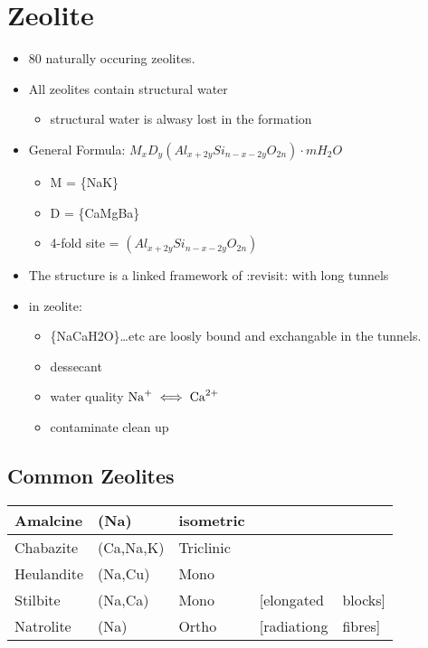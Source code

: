 \documentclass[11pt]{article}
\begin{document}
\section{Zeolite}
\label{sec-3}
\begin{itemize}
\item 80 naturally occuring zeolites.
\item All zeolites contain structural water 
\begin{itemize}
\item structural water is alwasy lost in the formation
\end{itemize}
\item General Formula: $M_{x}D_{y} (Al_{x + 2y} Si_{n-x-2y}O_{2n}) \cdot mH_{2}O$
\begin{itemize}
\item M = \ce\{Na\text{,}K\}
\item D = \ce\{Ca\text{,}Mg\text{,}Ba\}
\item 4-fold site = $(Al_{x + 2y} Si_{n-x-2y}O_{2n})$
\end{itemize}
\item The structure is a linked framework of :revisit: with long tunnels
\item in zeolite:
\begin{itemize}
\item \ce\{Na\text{,}Ca\text{,}H2O\}\ldots{}etc are loosly bound and exchangable in the tunnels.
\item dessecant
\item water quality $\ce{Na^+} \iff \ce{Ca^2+}$
\item contaminate clean up
\end{itemize}
\end{itemize}

\subsection{Common Zeolites}
\label{sec-3-1}
\begin{center}
\begin{tabular}{lllll}
\hline
Amalcine & (Na) & isometric &  & \\
\hline
Chabazite & (Ca,Na,K) & Triclinic &  & \\
Heulandite & (Na,Cu) & Mono &  & \\
Stilbite & (Na,Ca) & Mono & [elongated & blocks]\\
Natrolite & (Na) & Ortho & [radiationg & fibres]\\
\end{tabular}
\end{center}
\end{document}
